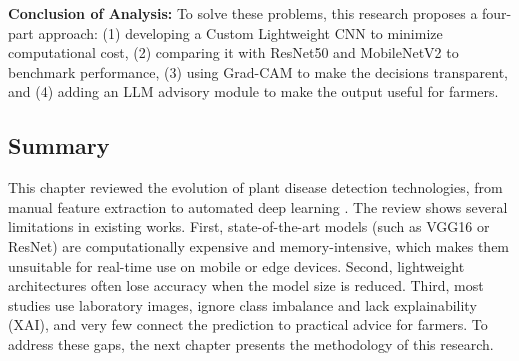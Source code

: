 \noindent \textbf{Conclusion of Analysis:} To solve these problems, this research proposes a four-part approach: (1) developing a Custom Lightweight CNN to minimize computational cost, (2) comparing it with ResNet50 and MobileNetV2 to benchmark performance, (3) using Grad-CAM to make the decisions transparent, and (4) adding an LLM advisory module to make the output useful for farmers.

\subsection*{Summary}
This chapter reviewed the evolution of plant disease detection technologies, from manual feature extraction to automated deep learning \cite{ngugi2021recent, mohanty2016using}. The review shows several limitations in existing works. First, state-of-the-art models (such as VGG16 or ResNet) are computationally expensive and memory-intensive, which makes them unsuitable for real-time use on mobile or edge devices. Second, lightweight architectures often lose accuracy when the model size is reduced. Third, most studies use laboratory images, ignore class imbalance and lack explainability (XAI), and very few connect the prediction to practical advice for farmers. To address these gaps, the next chapter presents the methodology of this research.

